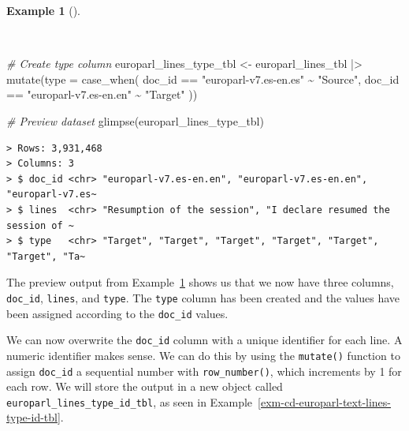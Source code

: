 \documentclass[
  letterpaper,
  DIV=11,
  numbers=noendperiod]{scrreport}
\newenvironment{Shaded}{\begin{snugshade}}{\end{snugshade}}
\newcommand{\AttributeTok}[1]{\textcolor[rgb]{0.00,0.00,0.00}{#1}}
\newcommand{\CommentTok}[1]{\textcolor[rgb]{0.00,0.00,0.00}{\textit{#1}}}
\newcommand{\FunctionTok}[1]{\textcolor[rgb]{0.00,0.00,0.00}{#1}}
\newcommand{\NormalTok}[1]{\textcolor[rgb]{0.00,0.00,0.00}{#1}}
\newcommand{\OtherTok}[1]{\textcolor[rgb]{0.00,0.00,0.00}{#1}}
\newcommand{\SpecialCharTok}[1]{\textcolor[rgb]{0.00,0.00,0.00}{#1}}
\newcommand{\StringTok}[1]{\textcolor[rgb]{0.00,0.00,0.00}{#1}}
\theoremstyle{definition}
\newtheorem{example}{Example}[chapter]
\theoremstyle{remark}
\begin{document}
\begin{example}[]\protect\hypertarget{exm-cd-europarl-text-lines-type-tbl}{}\label{exm-cd-europarl-text-lines-type-tbl}

~

\begin{Shaded}
\begin{Highlighting}[]
\CommentTok{\# Create \textasciigrave{}type\textasciigrave{} column}
\NormalTok{europarl\_lines\_type\_tbl }\OtherTok{\textless{}{-}} 
\NormalTok{  europarl\_lines\_tbl }\SpecialCharTok{|\textgreater{}} 
  \FunctionTok{mutate}\NormalTok{(}\AttributeTok{type =} \FunctionTok{case\_when}\NormalTok{(}
\NormalTok{    doc\_id }\SpecialCharTok{==} \StringTok{"europarl{-}v7.es{-}en.es"} \SpecialCharTok{\textasciitilde{}} \StringTok{"Source"}\NormalTok{,}
\NormalTok{    doc\_id }\SpecialCharTok{==} \StringTok{"europarl{-}v7.es{-}en.en"} \SpecialCharTok{\textasciitilde{}} \StringTok{"Target"}
\NormalTok{  ))}

\CommentTok{\# Preview dataset}
\FunctionTok{glimpse}\NormalTok{(europarl\_lines\_type\_tbl)}
\end{Highlighting}
\end{Shaded}

\begin{verbatim}
> Rows: 3,931,468
> Columns: 3
> $ doc_id <chr> "europarl-v7.es-en.en", "europarl-v7.es-en.en", "europarl-v7.es~
> $ lines  <chr> "Resumption of the session", "I declare resumed the session of ~
> $ type   <chr> "Target", "Target", "Target", "Target", "Target", "Target", "Ta~
\end{verbatim}

\end{example}

The preview output from
Example~\ref{exm-cd-europarl-text-lines-type-tbl} shows us that we now
have three columns, \texttt{doc\_id}, \texttt{lines}, and \texttt{type}.
The \texttt{type} column has been created and the values have been
assigned according to the \texttt{doc\_id} values.

We can now overwrite the \texttt{doc\_id} column with a unique
identifier for each line. A numeric identifier makes sense. We can do
this by using the \texttt{mutate()} function to assign \texttt{doc\_id}
a sequential number with \texttt{row\_number()}, which increments by 1
for each row. We will store the output in a new object called
\texttt{europarl\_lines\_type\_id\_tbl}, as seen in
Example~\ref{exm-cd-europarl-text-lines-type-id-tbl}.
\end{document}
